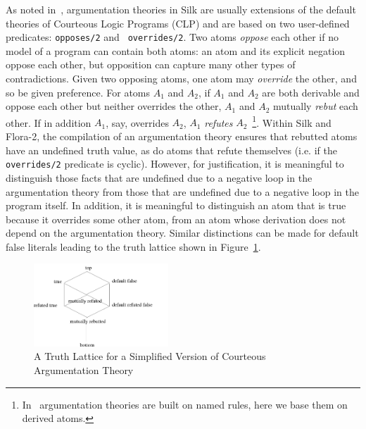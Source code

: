 As noted in~\cite{WGKFL09}, argumentation theories in Silk are usually
extensions of the default theories of Courteous Logic Programs (CLP)
and are based on two user-defined predicates: {\tt opposes/2} and {\tt
  overrides/2}.  Two atoms {\em oppose} each other if no model of a
program can contain both atoms: an atom and its explicit negation
oppose each other, but opposition can capture many other types of
contradictions.  Given two opposing atoms, one atom may {\em override}
the other, and so be given preference.  For atoms $A_1$ and $A_2$, if
$A_1$ and $A_2$ are both derivable and oppose each other but neither
overrides the other, $A_1$ and $A_2$ mutually {\em rebut} each other.
If in addition $A_1$, say, overrides $A_2$, $A_1$ {\em refutes}
$A_2$~\footnote{In~\cite{WGKFL09} argumentation theories are built on
  named rules, here we base them on derived atoms.}.  Within Silk and
Flora-2, the compilation of an argumentation theory ensures that
rebutted atoms have an undefined truth value, as do atoms that refute
themselves (i.e. if the {\tt overrides/2} predicate is cyclic).
However, for justification, it is meaningful to distinguish those
facts that are undefined due to a negative loop in the argumentation
theory from those that are undefined due to a negative loop in the
program itself.  In addition, it is meaningful to distinguish an atom
that is true because it overrides some other atom, from an atom whose
derivation does not depend on the argumentation theory.  Similar
distinctions can be made for default false literals leading to the
truth lattice shown in Figure~\ref{fig:courteous}.
\begin{figure}
\centering
\includegraphics[width=0.45\textwidth]{courteous2}
\caption{A Truth Lattice for a Simplified Version of Courteous Argumentation Theory} 
\label{fig:courteous}
\end{figure}
%

